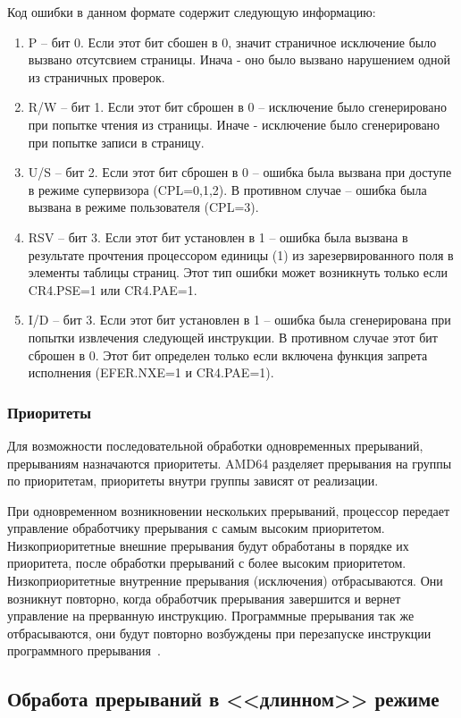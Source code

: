 Код ошибки в данном формате содержит следующую информацию:
\begin{enumerate}
\item P -- бит 0. Если этот бит сбошен в 0, значит страничное исключение было
вызвано отсутсвием страницы. Инача - оно было вызвано нарушением одной из
страничных проверок.
\item R/W -- бит 1. Если этот бит сброшен в 0 -- исключение было сгенерировано
при попытке чтения из страницы. Иначе - исключение было сгенерировано при
попытке записи в страницу.
\item U/S -- бит 2. Если этот бит сброшен в 0 -- ошибка была вызвана при
доступе в режиме супервизора (CPL=0,1,2). В противном случае -- ошибка была
вызвана в режиме пользователя (CPL=3).
\item RSV -- бит 3. Если этот бит установлен в 1 -- ошибка была вызвана в
результате прочтения процессором единицы (1) из зарезервированного поля в
элементы таблицы страниц. Этот тип ошибки может возникнуть только если
CR4.PSE=1 или CR4.PAE=1.
\item I/D -- бит 3. Если этот бит установлен в 1 -- ошибка была сгенерирована
при попытки извлечения следующей инструкции. В противном случае этот бит
сброшен в 0. Этот бит определен только если включена функция запрета
исполнения (EFER.NXE=1 и CR4.PAE=1).
\end{enumerate}

\subsubsection*{Приоритеты}
Для возможности последовательной обработки одновременных прерываний,
прерываниям назначаются приоритеты. AMD64 разделяет прерывания на группы по
приоритетам, приоритеты внутри группы зависят от реализации.

При одновременном возникновении нескольких прерываний, процессор передает
управление обработчику прерывания с самым высоким приоритетом.
Низкоприоритетные внешние прерывания будут обработаны в порядке их приоритета,
после обработки прерываний с более высоким приоритетом. Низкоприоритетные
внутренние прерывания (исключения) отбрасываются. Они возникнут повторно,
когда обработчик прерывания завершится и вернет управление на прерванную
инструкцию. Программные прерывания так же отбрасываются, они будут повторно
возбуждены при перезапуске инструкции программного прерывания~\cite[стр. 232]{amd_pm_v2}.

\subsection{Обработа прерываний в <<длинном>> режиме}
